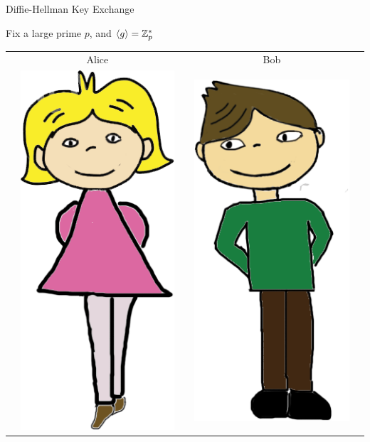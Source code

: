 \documentclass[usenames,dvipsnames, 9pt]{beamer}
\begin{document}
\begin{frame}{Diffie-Hellman Key Exchange}
\Large
\begin{center}
Fix  a large prime $p$, and $\langle g \rangle = {{\mathbb Z}}_p^\ast$
\large 
	\begin{center}
		\begin{tabular}{l c c c l}
			& Alice  & & Bob &  \\
			& \multirow{5}{*}{\includegraphics[scale=0.15]{Alice}} & & 
			\multirow{5}{*}{\includegraphics[scale=0.15]{Bob}} &    \\

\end{tabular}
\end{center}
\end{center}
\end{frame}
\end{document}
